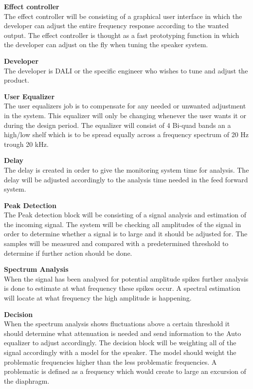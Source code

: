 \textbf{Effect controller} \\
The effect controller will be consisting of a graphical user interface in which the developer can adjust the entire frequency response according to the wanted output. The effect controller is thought as a fast prototyping function in which the developer can adjust on the fly when tuning the speaker system.

\textbf{Developer} \\
The developer is DALI or the specific engineer who wishes to tune and adjust the product.

\textbf{User Equalizer} \\
The user equalizers job is to compensate for any needed or unwanted adjustment in the system. This equalizer will only be changing whenever the user wants it or during the design period. The equalizer will consist of 4 Bi-quad bands an a high/low shelf which is to be spread equally across a frequency spectrum of 20 Hz trough 20 kHz.

\textbf{Delay} \\
The delay is created in order to give the monitoring system time for analysis. The delay will be adjusted accordingly to the analysis time needed in the feed forward system.


\textbf{Peak Detection} \\
The Peak detection block will be consisting of a signal analysis and estimation of the incoming signal. The system will be checking all amplitudes of the signal in order to determine whether a signal is to large and it should be adjusted for. The samples will be measured and compared with a predetermined threshold to determine if further action should be done.

\textbf{Spectrum Analysis} \\
When the signal has been analysed for potential amplitude spikes further analysis is done to estimate at what frequency these spikes occur. A spectral estimation will locate at what frequency the high amplitude is happening.  


\textbf{Decision} \\
When the spectrum analysis shows fluctuations above a certain threshold it should determine what attenuation is needed and send information to the Auto equalizer to adjust accordingly. The decision block will be weighting all of the signal accordingly with a model for the speaker. The model should weight the problematic frequencies higher than the less problematic frequencies. A problematic is defined as a frequency which would create to large an excursion of the diaphragm. 



